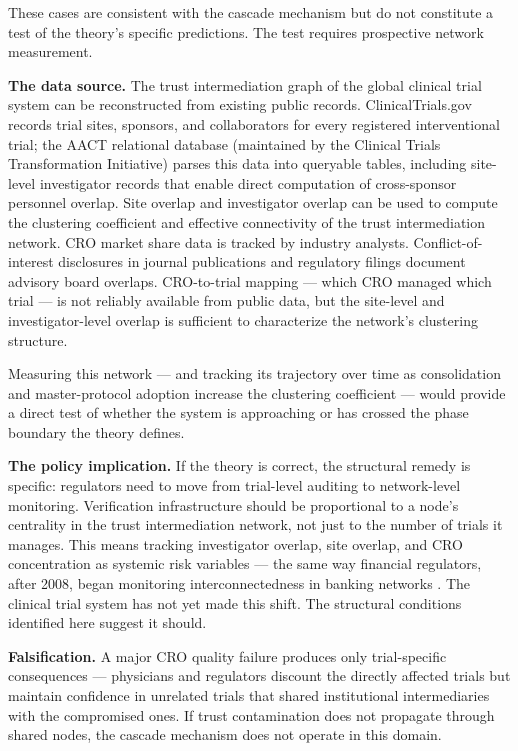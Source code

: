 \documentclass[11pt,a4paper]{article}
\begin{document}
These cases are consistent with the cascade mechanism but do not constitute a test of the theory's specific predictions. The test requires prospective network measurement.

\textbf{The data source.} The trust intermediation graph of the global clinical trial system can be reconstructed from existing public records. ClinicalTrials.gov records trial sites, sponsors, and collaborators for every registered interventional trial; the AACT relational database (maintained by the Clinical Trials Transformation Initiative) parses this data into queryable tables, including site-level investigator records that enable direct computation of cross-sponsor personnel overlap. Site overlap and investigator overlap can be used to compute the clustering coefficient and effective connectivity of the trust intermediation network. CRO market share data is tracked by industry analysts. Conflict-of-interest disclosures in journal publications and regulatory filings document advisory board overlaps. CRO-to-trial mapping --- which CRO managed which trial --- is not reliably available from public data, but the site-level and investigator-level overlap is sufficient to characterize the network's clustering structure.

Measuring this network --- and tracking its trajectory over time as consolidation and master-protocol adoption increase the clustering coefficient --- would provide a direct test of whether the system is approaching or has crossed the phase boundary the theory defines.

\textbf{The policy implication.} If the theory is correct, the structural remedy is specific: regulators need to move from trial-level auditing to network-level monitoring. Verification infrastructure should be proportional to a node's centrality in the trust intermediation network, not just to the number of trials it manages. This means tracking investigator overlap, site overlap, and CRO concentration as systemic risk variables --- the same way financial regulators, after 2008, began monitoring interconnectedness in banking networks \cite{acemoglu2015,haldane2011}. The clinical trial system has not yet made this shift. The structural conditions identified here suggest it should.

\textbf{Falsification.} A major CRO quality failure produces only trial-specific consequences --- physicians and regulators discount the directly affected trials but maintain confidence in unrelated trials that shared institutional intermediaries with the compromised ones. If trust contamination does not propagate through shared nodes, the cascade mechanism does not operate in this domain.
\end{document}
